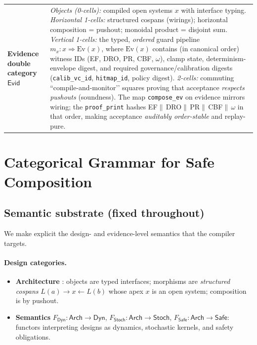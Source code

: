 \documentclass[10pt]{article}
\newcommand{\Dyn}{\mathsf{Dyn}}
\newcommand{\Arch}{\mathsf{Arch}}
\newcommand{\Stoch}{\mathsf{Stoch}}
\newcommand{\Safe}{\mathsf{Safe}}
\newcommand{\Evid}{\mathsf{Evid}} %
\begin{document}
\begin{tabularx}{\textwidth}{@{}>{\raggedright\arraybackslash}p{} X @{}}
\textbf{Evidence double category $\Evid$} &
\emph{Objects (0-cells):} compiled open systems $x$ with interface typing.\newline
\emph{Horizontal 1-cells:} structured cospans (wirings); horizontal composition = pushout; monoidal product = disjoint sum.\newline
\emph{Vertical 1-cells:} the typed, \emph{ordered} guard pipeline $m_x:x\Rightarrow\mathrm{Ev}(x)$, where $\mathrm{Ev}(x)$ contains (in canonical order) witness IDs (EF, DRO, PR, CBF, $\omega$), clamp state, determinism-envelope digest, and required governance/calibration digests (\texttt{calib\_vc\_id}, \texttt{hitmap\_id}, policy digest).\newline
\emph{2-cells:} commuting “compile-and-monitor’’ squares proving that acceptance \emph{respects pushouts} (soundness). The map \texttt{compose\_ev} on evidence mirrors wiring; the \texttt{proof\_print} hashes EF$\|\,$DRO$\|\,$PR$\|\,$CBF$\|\,$$\omega$ in that order, making acceptance \emph{auditably order-stable} and replay-pure.
\end{tabularx}

\section{Categorical Grammar for Safe Composition}
\label{sec:cat-grammar}

\subsection{Semantic substrate (fixed throughout)}
We make explicit the design- and evidence-level semantics that the compiler targets.

\paragraph{Design categories.}
\begin{itemize}[leftmargin=*]
  \item \textbf{Architecture} \Arch: objects are typed interfaces; morphisms are \emph{structured cospans}
  $L(a)\to x \leftarrow L(b)$ whose apex $x$ is an open system; composition is by pushout.
  \item \textbf{Semantics} $F_{\Dyn}:\Arch\to\Dyn$, $F_{\Stoch}:\Arch\to\Stoch$, $F_{\Safe}:\Arch\to\Safe$:
  functors interpreting designs as dynamics, stochastic kernels, and safety obligations.
\end{itemize}
\end{document}
